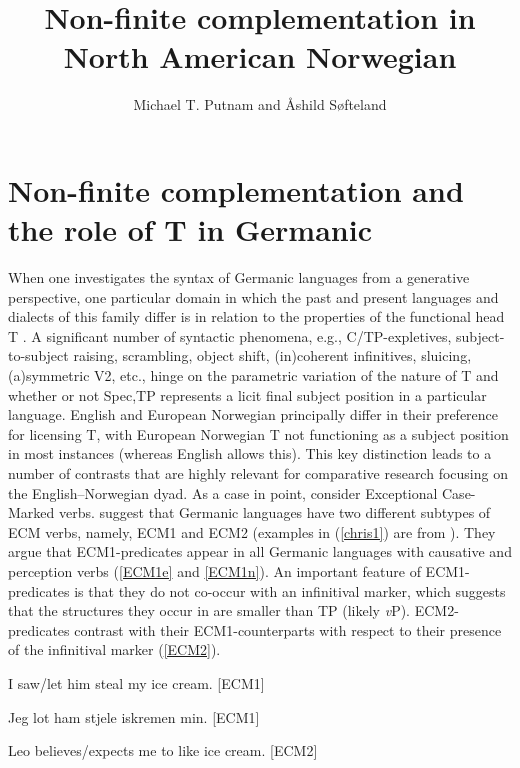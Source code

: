 \documentclass[output=paper,colorlinks,citecolor=brown]{langscibook}
\author{Michael T. Putnam\orcid{}\affiliation{Penn State University \& The University of Greenwich} and Åshild Søfteland\orcid{}\affiliation{Østfold University College}}
\title{Non-finite complementation in North American Norwegian}
\begin{document}
\maketitle

\section{Non-finite complementation and the role of T in Germanic}\label{putnam-intro}
When one investigates the syntax of Germanic languages from a generative perspective, one particular domain in which the past and present languages and dialects of this family differ is in relation to the properties of the functional head T \citep{bobjonas96,bobthrain98}. A significant number of syntactic phenomena, e.g., C/TP-expletives, subject-to-subject raising, scrambling, object shift, (in)coherent infinitives, sluicing, (a)symmetric V2, etc., hinge on the parametric variation of the nature of T and whether or not Spec,TP represents a licit final subject position in a particular language. English and European Norwegian principally differ in their preference for licensing T, with European Norwegian T not functioning as a subject position in most instances (whereas English allows this). This key distinction leads to a number of contrasts that are highly relevant for comparative research focusing on the English--Norwegian dyad. As a case in point, consider Exceptional Case-Marked verbs. \citet{christo2020} suggest that Germanic languages have two different subtypes of ECM verbs, namely, ECM1 and ECM2 (examples in (\ref{chris1}) are from \citealt[393]{christo2020}). They argue that ECM1-predicates appear in all Germanic languages with causative and perception verbs (\ref{ECM1e} and \ref{ECM1n}). An important feature of ECM1-predicates is that they do not co-occur with an infinitival marker, which suggests that the structures they occur in are smaller than TP (likely \textit{v}P). ECM2-predicates contrast with their ECM1-counterparts with respect to their presence of the infinitival marker (\ref{ECM2}). 

\begin{exe}
\item \label{chris1}
    \begin{xlist}
    \item \label{ECM1e} I saw/let him steal my ice cream. \hfill[ECM1]
    \item \label{ECM1n} Jeg lot ham stjele iskremen min. \hfill[ECM1]
    \item \label{ECM2} Leo believes/expects me to like ice cream. \hfill[ECM2]
    \end{xlist}
\end{exe}
\end{document}
